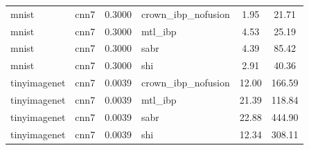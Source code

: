 \begin{tabular}{llllcc}
mnist & cnn7 & 0.3000 & crown\_ibp\_nofusion & 1.95 & 21.71 \\
mnist & cnn7 & 0.3000 & mtl\_ibp & 4.53 & 25.19 \\
mnist & cnn7 & 0.3000 & sabr & 4.39 & 85.42 \\
mnist & cnn7 & 0.3000 & shi & 2.91 & 40.36 \\
tinyimagenet & cnn7 & 0.0039 & crown\_ibp\_nofusion & 12.00 & 166.59 \\
tinyimagenet & cnn7 & 0.0039 & mtl\_ibp & 21.39 & 118.84 \\
tinyimagenet & cnn7 & 0.0039 & sabr & 22.88 & 444.90 \\
tinyimagenet & cnn7 & 0.0039 & shi & 12.34 & 308.11 \\
\bottomrule
\end{tabular}